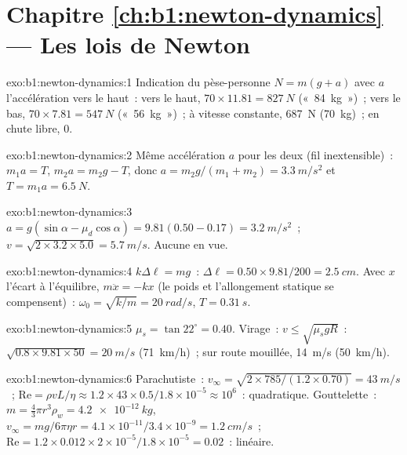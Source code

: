 \section*{Chapitre \ref{ch:b1:newton-dynamics} --- Les lois de Newton}

\begin{solution}{exo:b1:newton-dynamics:1}
Indication du pèse-personne $N = m(g + a)$ avec $a$ l'accélération vers
le haut~: vers le haut, $70 \times 11.81 = \qty{827}{N}$ («~\qty{84}{kg}~»)~; vers le bas, $70 \times 7.81 =
\qty{547}{N}$ («~\qty{56}{kg}~»)~; à vitesse constante, \qty{687}{N}
(\qty{70}{kg})~; en chute libre, $0$.
\end{solution}

\begin{solution}{exo:b1:newton-dynamics:2}
Même accélération $a$ pour les deux (fil inextensible)~: $m_1a = T$,
$m_2a = m_2g - T$, donc $a = m_2g/(m_1 + m_2) = \qty{3.3}{m/s^2}$ et
$T = m_1a = \qty{6.5}{N}$.
\end{solution}

\begin{solution}{exo:b1:newton-dynamics:3}
$a = g(\sin\alpha - \mu_d\cos\alpha) = 9.81(0.50 - 0.17) = \qty{3.2}{m/s^2}$~;
$v = \sqrt{2 \times 3.2 \times 5.0} = \qty{5.7}{m/s}$. Aucune  en vue.
\end{solution}

\begin{solution}{exo:b1:newton-dynamics:4}
$k\Delta\ell = mg$~: $\Delta\ell = 0.50 \times 9.81/200 = \qty{2.5}{cm}$.
Avec $x$ l'écart à l'équilibre, $m\ddot x = -kx$ (le poids et
l'allongement statique se compensent)~: $\omega_0 = \sqrt{k/m} = \qty{20}{rad/s}$,
$T = \qty{0.31}{s}$.
\end{solution}

\begin{solution}{exo:b1:newton-dynamics:5}
$\mu_s = \tan 22^\circ = 0.40$. Virage~: $v \leq \sqrt{\mu_sgR}$~: $\sqrt{0.8
\times 9.81 \times 50} = \qty{20}{m/s}$ (\qty{71}{km/h})~; sur route
mouillée, \qty{14}{m/s} (\qty{50}{km/h}).
\end{solution}

\begin{solution}{exo:b1:newton-dynamics:6}
Parachutiste~: $v_\infty = \sqrt{2 \times 785/(1.2 \times 0.70)} = \qty{43}{m/s}$~;
$\mathrm{Re} = \rho vL/\eta \approx 1.2 \times 43 \times 0.5/1.8\times10^{-5}
\approx 10^6$~: quadratique. Gouttelette~: $m = \tfrac43\pi r^3\rho_w = \qty{4.2e-12}{kg}$,
$v_\infty = mg/6\pi\eta r = 4.1\times10^{-11}/3.4\times10^{-9} = \qty{1.2}{cm/s}$~;
$\mathrm{Re} = 1.2 \times 0.012 \times 2\times10^{-5}/1.8\times10^{-5} = 0.02$~:
linéaire.
\end{solution}

